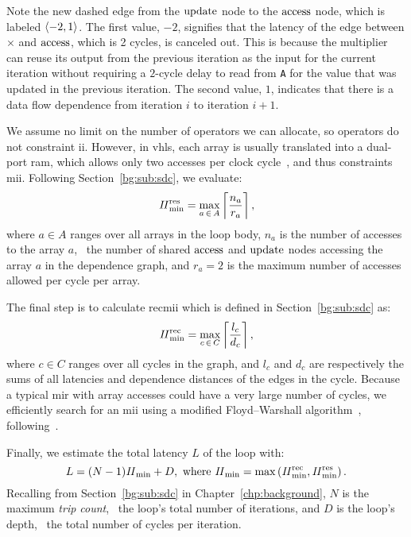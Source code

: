 Note the new dashed edge from the $\operatorname{\mathrm{update}}$ node to the $\operatorname{\mathrm{access}}$ node,
which is labeled $\langle{-2},{1}\rangle$.  The first value, $-2$, signifies that the
latency of the edge between $\times$ and $\operatorname{\mathrm{access}}$, which is 2 cycles, is
canceled out.  This is because the multiplier can reuse its output from the
previous iteration as the input for the current iteration without requiring a
$2$-cycle delay to read from \verb|A| for the value that was updated in the
previous iteration.  The second value, $1$, indicates that there is a data flow
dependence from iteration $i$ to iteration $i+1$.

We assume no limit on the number of operators we can allocate, so operators
do not constraint \gls{ii}.  However, in \gls{vhls}, each array is usually
translated into a dual-port \gls{ram}, which allows only two accesses per
clock cycle~\cite{vivado_hls}, and thus constraints \gls{mii}.  Following
Section~\ref{bg:sub:sdc}, we evaluate:
\begin{equation}
    \mathit{II}_{\rm min}^{\rm res} = \max_{a\,\in\,A} \left\lceil \frac{n_a}{r_a} \right\rceil,
\end{equation}
where $a \in A$ ranges over all arrays in the loop body, $n_a$ is the number of
accesses to the array $a$, \ie~the number of shared $\operatorname{\mathrm{access}}$ and $\operatorname{\mathrm{update}}$
nodes accessing the array $a$ in the dependence graph, and $r_a = 2$ is the
maximum number of accesses allowed per cycle per array.

The final step is to calculate \acrfull{recmii} which is defined in
Section~\ref{bg:sub:sdc} as:
\begin{equation}
    \mathit{II}_{\rm min}^{\rm rec} = \max_{c\,\in\,C} \left\lceil \frac{l_c}{d_c} \right\rceil,
\end{equation}
where $c \in C$ ranges over all cycles in the graph, and $l_c$ and $d_c$ are
respectively the sums of all latencies and dependence distances of the edges in
the cycle.  Because a typical \gls{mir} with array accesses could have a very
large number of cycles, we efficiently search for an \gls{mii} using a modified
Floyd--Warshall algorithm~\cite{floyd62}, following~\cite{rau94}.

Finally, we estimate the total latency $L$ of the loop with:
\begin{equation}
    L = (N - 1) \mathit{II}_{\rm min} + D,
    \text{~where~}
        \mathit{II}_{\rm min} = \max\left(\mathit{II}_{\rm min}^{\rm rec}, \mathit{II}_{\rm min}^{\rm res}\right).
    \nonumber
\end{equation}
Recalling from Section~\ref{bg:sub:sdc} in Chapter~\ref{chp:background}, $N$
is the maximum \emph{trip count}, \ie~the loop's total number of iterations,
and $D$ is the loop's depth, \ie~the total number of cycles per iteration.

